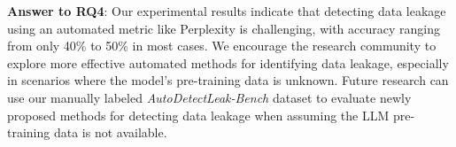 \vspace{0.2cm}
\noindent
\begin{tcolorbox} [boxrule=0.8pt,
                top=0.2pt,
                  bottom=0.2pt]
    \textbf{Answer to RQ4}: 
     Our experimental results indicate that detecting data leakage using an automated metric like Perplexity is challenging, with accuracy ranging from only 40\% to 50\% in most cases. We encourage the research community to explore more effective automated methods for identifying data leakage, especially in scenarios where the model's pre-training data is unknown.  
     Future research can use our manually labeled \textit{AutoDetectLeak-Bench} dataset to evaluate newly proposed methods for detecting data leakage when assuming the LLM pre-training data is not available.
\end{tcolorbox}





